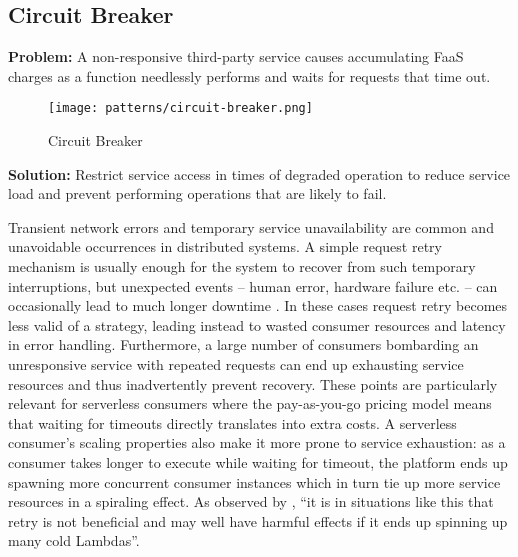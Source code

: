 \subsection{Circuit Breaker} \label{subsec:circuitBreaker}

\textbf{Problem:} A non-responsive third-party service causes accumulating FaaS charges as a function needlessly performs and waits for requests that time out.

\begin{figure}[h]
  \centering
  \texttt{[image: patterns/circuit-breaker.png]}
  \caption{Circuit Breaker}
  \label{fig:circuitBreaker}
\end{figure}

\textbf{Solution:} Restrict service access in times of degraded operation to reduce service load and prevent performing operations that are likely to fail.

Transient network errors and temporary service unavailability are common and unavoidable occurrences in distributed systems. A simple request retry mechanism is usually enough for the system to recover from such temporary interruptions, but unexpected events -- human error, hardware failure etc. -- can occasionally lead to much longer downtime \parencite{microsoft18cloudPatterns}. In these cases request retry becomes less valid of a strategy, leading instead to wasted consumer resources and latency in error handling. Furthermore, a large number of consumers bombarding an unresponsive service with repeated requests can end up exhausting service resources and thus inadvertently prevent recovery. These points are particularly relevant for serverless consumers where the pay-as-you-go pricing model means that waiting for timeouts directly translates into extra costs. A serverless consumer's scaling properties also make it more prone to service exhaustion: as a consumer takes longer to execute while waiting for timeout, the platform ends up spawning more concurrent consumer instances which in turn tie up more service resources in a spiraling effect. As observed by \textcite{bardsley18optimizationStrategies}, ``it is in situations like this that retry is not beneficial and may well have harmful effects if it ends up spinning up many cold Lambdas''.

